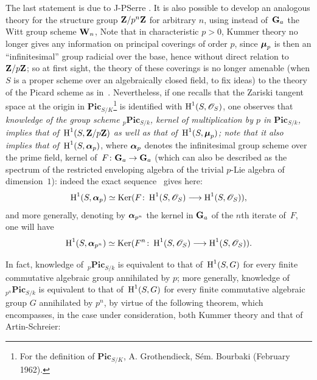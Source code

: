 \begin{remarks}
\label{XI.6.11}
The last statement is due to
J-P\ptbl Serre
\cite{XI.9}. It is
also possible to develop an analogous theory for
the structure group $\mathbf{Z}/p^n\mathbf{Z}$ for arbitrary $n$, using
instead of~$\mathbf{G}_a$ the Witt group scheme $\mathbf{W}_n$, \cf \loccit Note
that in characteristic $p>0$, Kummer theory no longer gives
any information on principal coverings of order $p$, since
$\boldsymbol{\mu}_p$ is then an ``infinitesimal'' group \ie radicial over the
base, hence without direct relation to $\mathbf{Z}/p\mathbf{Z}$; so at first sight,
the theory of these coverings is no longer amenable (when $S$ is a
proper scheme over an algebraically closed field, to fix
ideas) to the theory of the Picard scheme as
in~. Nevertheless, if one recalls that the Zariski tangent
space at the origin in
$\mathbf{Pic}_{S/K}$\kern1pt\footnote{For the definition of
$\mathbf{Pic}_{S/K}$, \cf A. Grothendieck, S\'em. Bourbaki 
(February 1962).} is identified with $\H^1(S,\cal{O}_S)$, one
observes that \emph{knowledge of the group scheme
${_p}\mathbf{Pic}_{S/k}$, kernel of multiplication by $p$ in
$\mathbf{Pic}_{S/k}$, implies that of~$\operatorname{H}^1(S,\mathbf{Z}/p\mathbf{Z})$ as well
as that of~$\operatorname{H}^1(S,\boldsymbol{\mu}_p)$; note that it also implies
that of~$\operatorname{H}^1(S,\boldsymbol{\alpha}_p)$}, where $\boldsymbol{\alpha}_p$
denotes the infinitesimal group scheme over the prime
field, kernel of~$F\colon\GG_a\to\GG_a$ (which can also be described
as the spectrum of the restricted enveloping algebra of the
trivial $p$-Lie algebra of dimension~$1$): indeed the exact
sequence~ gives here:
$$
\H^1(S,\bbalpha_p)\simeq\Ker
(F\colon\H^1(S,\cal{O}_S)\to\H^1(S,\cal{O}_S)),
$$
and more generally, denoting by $\boldsymbol{\alpha}_{p^n}$
the kernel in $\mathbf{G}_a$ of the $n$th iterate of~$F$, one will have
$$
\H^1(S,\bbalpha_{p^n})\simeq\Ker(F^n\colon\H^1(S,\cal{O}_S)\to
\H^1(S,\cal{O}_S)).
$$

In fact, knowledge of~${_p}\mathbf{Pic}_{S/k}$ is equivalent to
that of~$\operatorname{H}^1(S,G)$ for every finite commutative algebraic group
annihilated by $p$; more generally,
knowledge of~${_{p^n}}\mathbf{Pic}_{S/k}$ is equivalent to that
of~$\operatorname{H}^1(S,G)$ for every finite commutative algebraic group $G$
annihilated by $p^n$, by virtue of the following theorem, which encompasses,
in the case under consideration, both Kummer theory and
that of Artin-Schreier:


\end{remarks}
